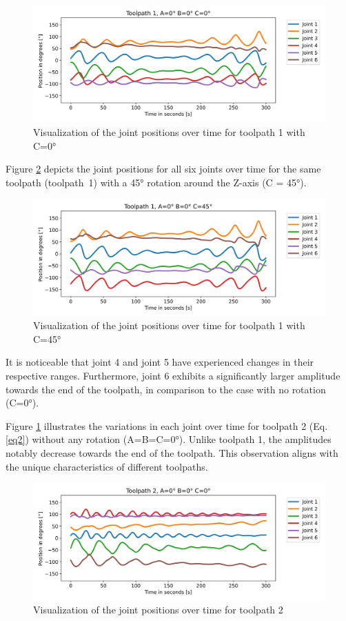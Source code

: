 \begin{figure}[H]
	\centerline{\includegraphics[width=1\textwidth]{figures/TP1ABC0.png}}
	\caption{Visualization of the joint positions over time for toolpath 1 with C=0°}
	\label{TP1ABC0}
\end{figure}

Figure \ref{TP1ABC45} depicts the joint positions for all six joints over time for the same toolpath (toolpath~1) with a 45° rotation around the Z-axis (C = 45°). 
\begin{figure}[H]
	\centerline{\includegraphics[width=1\textwidth]{figures/TP1ABC45.png}}
	\caption{Visualization of the joint positions over time for toolpath 1 with C=45°}
	\label{TP1ABC45}
\end{figure}
\newpage
It is noticeable that joint 4 and joint 5 have experienced changes in their respective ranges. Furthermore, joint 6 exhibits a significantly larger amplitude towards the end of the toolpath, in comparison to the case with no rotation (C=0°).

Figure \ref{TP1ABC0} illustrates the variations in each joint over time for toolpath 2 (Eq. \ref{eq2}) without any rotation (A=B=C=0°). Unlike toolpath 1, the amplitudes notably decrease towards the end of the toolpath. This observation aligns with the unique characteristics of different toolpaths.
 
\begin{figure}[H]
	\centerline{\includegraphics[width=1\textwidth]{figures/TP2ABC0.png}}
	\caption{Visualization of the joint positions over time for toolpath 2}
	\label{TP2ABC0}
\end{figure}

